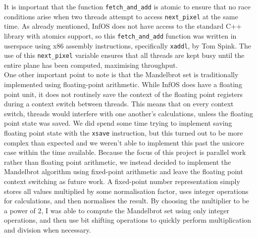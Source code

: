\documentclass[bsc,frontabs,twoside,singlespacing,parskip,deptreport]{infthesis}     %
\begin{document}
It is important that the function \verb|fetch_and_add| is atomic to ensure that no race conditions arise when two threads attempt to access \verb|next_pixel| at the same time. As already mentioned, InfOS does not have access to the standard C++ library with atomics support, so this \verb|fetch_and_add| function was written in userspace using x86 assembly instructions, specifically \verb|xaddl|, by Tom Spink. The use of this \verb|next_pixel| variable ensures that all threads are kept busy until the entire plane has been computed, maximising throughput. \\

One other important point to note is that the Mandelbrot set is traditionally implemented using floating-point arithmetic. While InfOS does have a floating point unit, it does not routinely save the context of the floating point registers during a context switch between threads. This means that on every context switch, threads would interfere with one another's calculations, unless the floating point state was saved. We did spend some time trying to implement saving floating point state with the \verb|xsave| instruction, but this turned out to be more complex than expected and we weren't able to implement this past the unicore case within the time available. Because the focus of this project is parallel work rather than floating point arithmetic, we instead decided to implement the Mandelbrot algorithm using fixed-point arithmetic and leave the floating point context switching as future work. A fixed-point number representation simply stores all values multiplied by some normalisation factor, uses integer operations for calculations, and then normalises the result. By choosing the multiplier to be a power of 2, I was able to compute the Mandelbrot set using only integer operations, and then use bit shifting operations to quickly perform multiplication and division when necessary.
\end{document}
